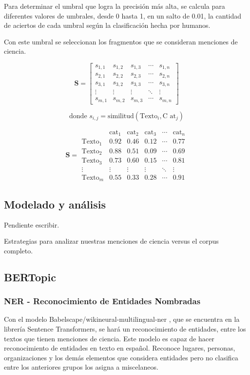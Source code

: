 \documentclass[11pt,a4paper]{article}
\begin{document}
	Para determinar el umbral que logra la precisión más alta, se calcula para diferentes valores de umbrales, desde 0 hasta 1, en un salto de 0.01, la cantidad de aciertos de cada umbral según la clasificación hecha por humanos. 
	
	Con este umbral se seleccionan los fragmentos que se consideran menciones de ciencia. 
	
	\[
	\mathbf{S} =
	\begin{bmatrix}
		s_{1,1} & s_{1,2} & s_{1,3} & \cdots & s_{1,n} \\
		s_{2,1} & s_{2,2} & s_{2,3} & \cdots & s_{2,n} \\
		s_{3,1} & s_{3,2} & s_{3,3} & \cdots & s_{3,n} \\
		\vdots  & \vdots  & \vdots  & \ddots & \vdots  \\
		s_{m,1} & s_{m,2} & s_{m,3} & \cdots & s_{m,n}
	\end{bmatrix}
	\]
	
	\[
	\text{donde } s_{i,j} = \text{similitud}( \text{Texto}_i, \text{C	at}_j )
	\]
	
	\[
	\mathbf{S} =
	\begin{array}{c|ccccc}
		& \text{cat}_1 & \text{cat}_2 & \text{cat}_3 & \cdots & \text{cat}_n \\ \hline
		\text{Texto}_1 & 0.92 & 0.46 & 0.12 & \cdots & 0.77 \\
		\text{Texto}_2 & 0.88 & 0.51 & 0.09 & \cdots & 0.69 \\
		\text{Texto}_3 & 0.73 & 0.60 & 0.15 & \cdots & 0.81 \\
		\vdots         & \vdots & \vdots & \vdots & \ddots & \vdots \\
		\text{Texto}_m & 0.55 & 0.33 & 0.28 & \cdots & 0.91
	\end{array}
	\]

	
	
	
	\subsection{Modelado y análisis}
	Pendiente escribir.
	
	Estrategias para analizar nuestras menciones de ciencia versus el corpus completo.
	
	\subsection{BERTopic}
	
	\subsubsection{NER - Reconocimiento de Entidades Nombradas}
	Con el modelo Babelscape/wikineural-multilingual-ner \cite{tedeschi-etal-2021-wikineural-combined}, que se encuentra en la librería Sentence Transformers, se hará un reconocimiento de entidades, entre los textos que tienen menciones de ciencia. Este modelo es capaz de hacer reconocimiento de entidades en texto en español. Reconoce lugares, personas, organizaciones y los demás elementos que considera entidades pero no clasifica entre los anteriores grupos los asigna a miscelaneos. 
	
\end{document}
